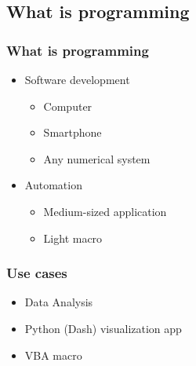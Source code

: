 \subsection{What is programming}
\begin{frame}\frametitle{What is programming}
   \begin{itemize}
      \item Software development
      \begin{itemize}
         \item Computer
         \item Smartphone
         \item Any numerical system
      \end{itemize}
      \item Automation
      \begin{itemize}
         \item Medium-sized application
         \item Light macro
      \end{itemize}
   \end{itemize}
\end{frame}

\begin{frame}\frametitle{Use cases}
   \begin{itemize}
      \item Data Analysis
      \item Python (Dash) visualization app
      \item VBA macro
   \end{itemize}
\end{frame}




